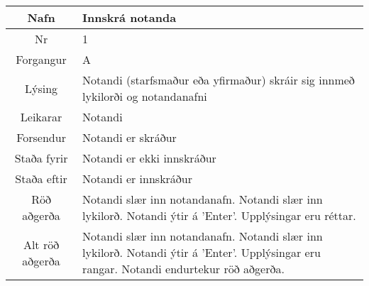 \documentclass[a4paper]{article}
\begin{document}
\begin{tabular}{|c|p{10cm}|}
\hline
Nafn&Innskrá notanda\\
\hline
Nr&1\\
\hline
Forgangur&A\\
\hline
Lýsing&Notandi (starfsmaður eða yfirmaður) skráir sig innmeð lykilorði og notandanafni\\
\hline
Leikarar&Notandi\\
\hline
Forsendur&Notandi er skráður\\
\hline
Staða fyrir&Notandi er ekki innskráður\\
\hline
Staða eftir&Notandi er innskráður\\
\hline
Röð aðgerða&Notandi slær inn notandanafn. Notandi slær inn lykilorð. Notandi ýtir á ’Enter’. Upplýsingar eru réttar.\\
\hline
Alt röð aðgerða&Notandi slær inn notandanafn. Notandi slær inn lykilorð. Notandi ýtir á ’Enter’. Upplýsingar eru rangar. Notandi endurtekur röð aðgerða.\\
\hline
\end{tabular}
\end{document}
